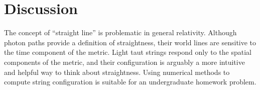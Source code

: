 \documentclass{ws-tpe}
\begin{document}
\section{Discussion}

The concept of ``straight line'' is problematic in general relativity.
Although photon paths provide a definition of straightness, their
world lines are sensitive to the time component of the metric.  Light
taut strings respond only to the spatial components of the metric, and
their configuration is arguably a more intuitive and helpful way to
think about straightness.  Using numerical methods to compute string
configuration is suitable for an undergraduate homework problem.



\end{document}
